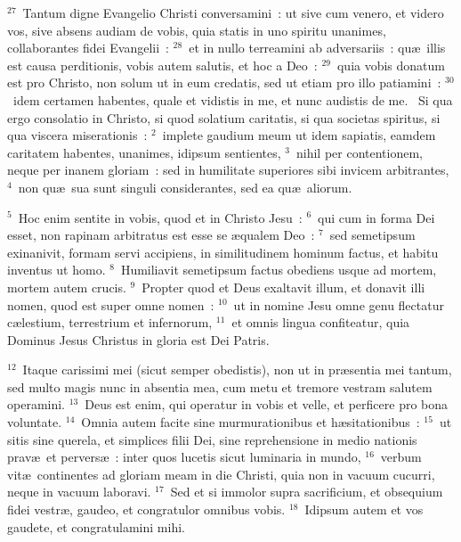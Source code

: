 ${}^{27}$~Tantum digne Evangelio Christi conversamini~: ut sive cum venero, et videro vos, sive absens audiam de vobis, quia statis in uno spiritu unanimes, collaborantes fidei Evangelii~:
${}^{28}$~et in nullo terreamini ab adversariis~: qu\ae\ illis est causa perditionis, vobis autem salutis, et hoc a Deo~:
${}^{29}$~quia vobis donatum est pro Christo, non solum ut in eum credatis, sed ut etiam pro illo patiamini~:
${}^{30}$~idem certamen habentes, quale et vidistis in me, et nunc audistis de me.
~Si qua ergo consolatio in Christo, si quod solatium caritatis, si qua societas spiritus, si qua viscera miserationis~:
${}^{2}$~implete gaudium meum ut idem sapiatis, eamdem caritatem habentes, unanimes, idipsum sentientes,
${}^{3}$~nihil per contentionem, neque per inanem gloriam~: sed in humilitate superiores sibi invicem arbitrantes,
${}^{4}$~non qu\ae\ sua sunt singuli considerantes, sed ea qu\ae\ aliorum.


${}^{5}$~Hoc enim sentite in vobis, quod et in Christo Jesu~:
${}^{6}$~qui cum in forma Dei esset, non rapinam arbitratus est esse se \ae qualem Deo~:
${}^{7}$~sed semetipsum exinanivit, formam servi accipiens, in similitudinem hominum factus, et habitu inventus ut homo.
${}^{8}$~Humiliavit semetipsum factus obediens usque ad mortem, mortem autem crucis.
${}^{9}$~Propter quod et Deus exaltavit illum, et donavit illi nomen, quod est super omne nomen~:
${}^{10}$~ut in nomine Jesu omne genu flectatur c\ae lestium, terrestrium et infernorum,
${}^{11}$~et omnis lingua confiteatur, quia Dominus Jesus Christus in gloria est Dei Patris.


${}^{12}$~Itaque carissimi mei (sicut semper obedistis), non ut in pr\ae sentia mei tantum, sed multo magis nunc in absentia mea, cum metu et tremore vestram salutem operamini.
${}^{13}$~Deus est enim, qui operatur in vobis et velle, et perficere pro bona voluntate.
${}^{14}$~Omnia autem facite sine murmurationibus et h\ae sitationibus~:
${}^{15}$~ut sitis sine querela, et simplices filii Dei, sine reprehensione in medio nationis prav\ae\ et pervers\ae~: inter quos lucetis sicut luminaria in mundo,
${}^{16}$~verbum vit\ae\ continentes ad gloriam meam in die Christi, quia non in vacuum cucurri, neque in vacuum laboravi.
${}^{17}$~Sed et si immolor supra sacrificium, et obsequium fidei vestr\ae , gaudeo, et congratulor omnibus vobis.
${}^{18}$~Idipsum autem et vos gaudete, et congratulamini mihi.


